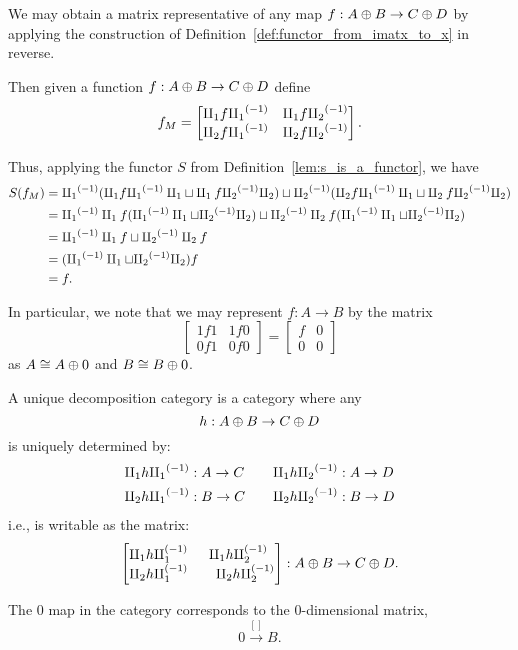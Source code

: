\begin{example}\label{ex:inverse_sum_category_maps_are_matrices}
  We may obtain a matrix representative of any map $f:A\oplus B\to C\oplus D$ by applying the construction of
  Definition~\ref{def:functor_from_imatx_to_x} in reverse.

  Then given a function   $f:A\oplus B \to C\oplus D$ define
  \[ f_M =
     \begin{bmatrix}
       \amalg_{1} f {\amalg_{1}}^{(-1)} & \amalg_{1} f {\amalg_{2}}^{(-1)} \\
       \amalg_{2} f {\amalg_{1}}^{(-1)} & \amalg_{2} f {\amalg_{2}}^{(-1)}
      \end{bmatrix}.
  \]

  Thus, applying the functor $S$ from Definition~\ref{lem:s_is_a_functor}, we have
  \begin{align*}
     S(f_M) &= {\amalg_{1}}^{(-1)} (\amalg_{1} f {\amalg_{1}}^{(-1)} \amalg_{1} \sqcup \amalg_{1} f {\amalg_{2}}^{(-1)} \amalg_{2}) \sqcup {\amalg_{2}}^{(-1)}( \amalg_{2} f {\amalg_{1}}^{(-1)}\amalg_{1}
     \sqcup \amalg_{2} f {\amalg_{2}}^{(-1)} \amalg_{2}) \\
     & = {\amalg_{1}}^{(-1)} \amalg_{1} f ({\amalg_{1}}^{(-1)} \amalg_{1} \sqcup {\amalg_{2}}^{(-1)} \amalg_{2}) \sqcup {\amalg_{2}}^{(-1)} \amalg_{2} f ( {\amalg_{1}}^{(-1)} \amalg_{1} \sqcup
     {\amalg_{2}}^{(-1)}\amalg_{2}) \\
     & = {\amalg_{1}}^{(-1)} \amalg_{1} f \sqcup {\amalg_{2}}^{(-1)} \amalg_{2} f \\
     & = ({\amalg_{1}}^{(-1)} \amalg_{1} \sqcup {\amalg_{2}}^{(-1)} \amalg_{2}) f \\
     & = f.
  \end{align*}

In particular, we note that we may represent $f:A\to B$ by the matrix
\[
  \begin{bmatrix}
    1f1& 1f 0 \\ 0 f 1 & 0 f 0
  \end{bmatrix}
  =
  \begin{bmatrix}
    f& 0 \\ 0 & 0
  \end{bmatrix}
\]
as $A \cong A\oplus0$ and $B \cong B\oplus0$.
\end{example}


\begin{definition}\label{def:unique_decomposition_category}
A unique decomposition category\cite{haghverdi:2000phd} is a category where any
\[
  h:A\oplus B \to C\oplus D
\]
is uniquely determined by:
\begin{alignat*}{2}
  \amalg_{1}  h  {\amalg_{1}}^{(-1)} &: A \to C & \quad \amalg_{1}  h  {\amalg_{2}}^{(-1)} &: A \to D\\
  \amalg_{2}  h  {\amalg_{1}}^{(-1)} &: B \to C & \quad \amalg_{2}  h  {\amalg_{2}}^{(-1)} &: B \to D
\end{alignat*}
i.e., is writable as the matrix:
\[
  \begin{bmatrix}
    \amalg_{1}  h  \amalg_{1}^{(-1)} & \amalg_{1}  h  \amalg_{2}^{(-1)}\\
    \amalg_{2}  h  \amalg_{1}^{(-1)} &\quad \amalg_{2}  h  \amalg_{2}^{(-1)}
  \end{bmatrix}:
  A\oplus B \to C\oplus D.
\]

The $0$ map in the category corresponds to the $0$-dimensional matrix,
\[
  0\xrightarrow{[]}B.
\]
\end{definition}

